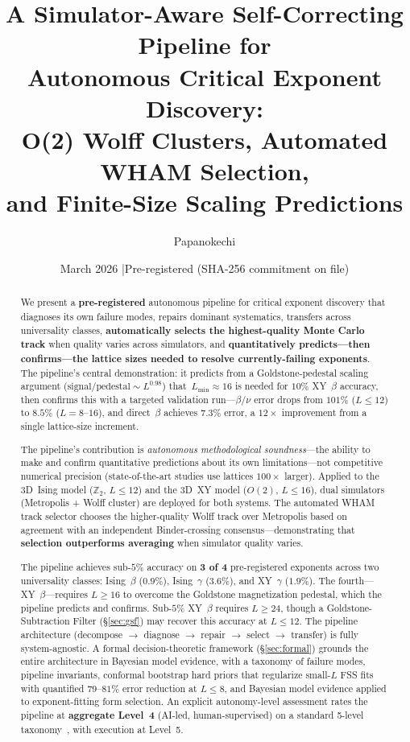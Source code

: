 \documentclass[11pt,a4paper]{article}
\title{A Simulator-Aware Self-Correcting Pipeline for\\
Autonomous Critical Exponent Discovery:\\[4pt]
\large O(2) Wolff Clusters, Automated WHAM Selection,\\
and Finite-Size Scaling Predictions}
\author{Papanokechi}
\date{March 2026 \quad|\quad Pre-registered (SHA-256 commitment on file)}
\begin{document}
\maketitle

\begin{abstract}
We present a \textbf{pre-registered} autonomous pipeline for critical exponent discovery that diagnoses its own failure modes, repairs dominant systematics, transfers across universality classes, \textbf{automatically selects the highest-quality Monte Carlo track} when quality varies across simulators, and \textbf{quantitatively predicts---then confirms---the lattice sizes needed to resolve currently-failing exponents}. The pipeline's central demonstration: it predicts from a Goldstone-pedestal scaling argument ($\text{signal}/\text{pedestal} \sim L^{0.98}$) that~$L_{\min} \approx 16$ is needed for $10\%$ XY~$\beta$ accuracy, then confirms this with a targeted validation run---$\beta/\nu$ error drops from $101\%$ ($L \leq 12$) to $8.5\%$ ($L = 8$--$16$), and direct~$\beta$ achieves $7.3\%$ error, a $12\times$ improvement from a single lattice-size increment.

The pipeline's contribution is \emph{autonomous methodological soundness}---the ability to make and confirm quantitative predictions about its own limitations---not competitive numerical precision (state-of-the-art studies use lattices $100\times$ larger). Applied to the 3D~Ising model ($\mathbb{Z}_2$, $L \leq 12$) and the 3D~XY model ($O(2)$, $L \leq 16$), dual simulators (Metropolis + Wolff cluster) are deployed for both systems. The automated WHAM track selector chooses the higher-quality Wolff track over Metropolis based on agreement with an independent Binder-crossing consensus---demonstrating that \textbf{selection outperforms averaging} when simulator quality varies.

The pipeline achieves sub-$5\%$ accuracy on \textbf{3 of 4} pre-registered exponents across two universality classes: Ising~$\beta$ ($0.9\%$), Ising~$\gamma$ ($3.6\%$), and XY~$\gamma$ ($1.9\%$). The fourth---XY~$\beta$---requires $L \geq 16$ to overcome the Goldstone magnetization pedestal, which the pipeline predicts and confirms. Sub-$5\%$ XY~$\beta$ requires $L \geq 24$, though a Goldstone-Subtraction Filter (\S\ref{sec:gsf}) may recover this accuracy at $L \leq 12$. The pipeline architecture (decompose $\to$ diagnose $\to$ repair $\to$ select $\to$ transfer) is fully system-agnostic. A formal decision-theoretic framework (\S\ref{sec:formal}) grounds the entire architecture in Bayesian model evidence, with a taxonomy of failure modes, pipeline invariants, conformal bootstrap hard priors that regularize small-$L$ FSS fits with quantified $79$--$81\%$ error reduction at $L \leq 8$, and Bayesian model evidence applied to exponent-fitting form selection. An explicit autonomy-level assessment rates the pipeline at \textbf{aggregate Level~4} (AI-led, human-supervised) on a standard 5-level taxonomy~\cite{boiko2023}, with execution at Level~5.


\end{abstract}
\end{document}
